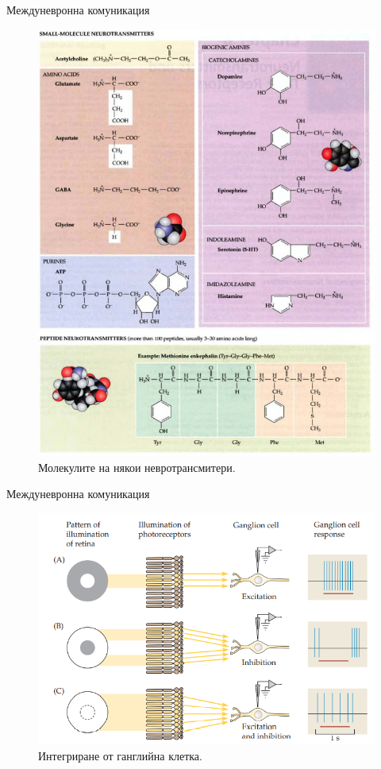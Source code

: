 \begin{frame}[t]{Междуневронна комуникация}
  \begin{figure}[htbp!]
    \centering
    \includegraphics[width=\textwidth,height=0.7\textheight,keepaspectratio]{neurotransmitters.PNG}
    \caption{Молекулите на някои невротрансмитери. \cite[Фиг 6.1]{Neuroscience}}
  \end{figure}
\end{frame}

\begin{frame}[t]{Междуневронна комуникация}
  \begin{figure}[htbp!]
    \centering
    \includegraphics[width=\textwidth,height=0.7\textheight,keepaspectratio]{gangleon-integration.PNG}
    \caption{Интегриране от ганглийна клетка. \cite[Фиг 1.16]{Neuron}}
  \end{figure}
\end{frame}

